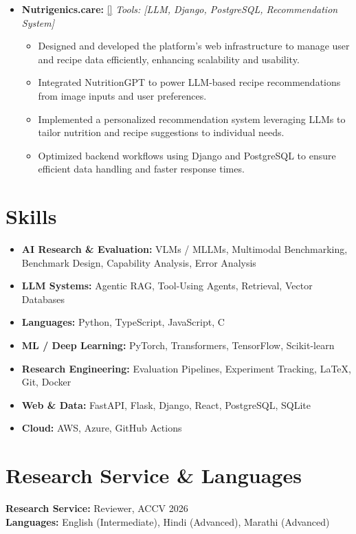 \documentclass[11pt,a4paper]{article}
\begin{document}
\begin{itemize}
\begin{itemize}
    \item Developed backend workflows and API integration using FastAPI and websockets for scalable deployment.
  \end{itemize}
  \par{}
  \item \textbf{Nutrigenics.care:} \href{https://nutrigenics.care}{[\faGlobe]}
  \textit{Tools: [LLM, Django, PostgreSQL, Recommendation System]}
  \begin{itemize}
    \item Designed and developed the platform's web infrastructure to manage user and recipe data efficiently, enhancing scalability and usability.
    \item Integrated NutritionGPT to power LLM-based recipe recommendations from image inputs and user preferences.
    \item Implemented a personalized recommendation system leveraging LLMs to tailor nutrition and recipe suggestions to individual needs.
    \item Optimized backend workflows using Django and PostgreSQL to ensure efficient data handling and faster response times.
  \end{itemize}
\end{itemize}

\section*{Skills}
\begin{itemize}
  \item \textbf{AI Research \& Evaluation:} VLMs / MLLMs, Multimodal Benchmarking, Benchmark Design, Capability Analysis, Error Analysis
  \item \textbf{LLM Systems:} Agentic RAG, Tool-Using Agents, Retrieval, Vector Databases
  \item \textbf{Languages:} Python, TypeScript, JavaScript, C
  \item \textbf{ML / Deep Learning:} PyTorch, Transformers, TensorFlow, Scikit-learn
  \item \textbf{Research Engineering:} Evaluation Pipelines, Experiment Tracking, LaTeX, Git, Docker
  \item \textbf{Web \& Data:} FastAPI, Flask, Django, React, PostgreSQL, SQLite
  \item \textbf{Cloud:} AWS, Azure, GitHub Actions
\end{itemize}

\section*{Research Service \& Languages}
\textbf{Research Service:} Reviewer, ACCV 2026\\
\textbf{Languages:} English (Intermediate), Hindi (Advanced), Marathi (Advanced)
\end{document}
